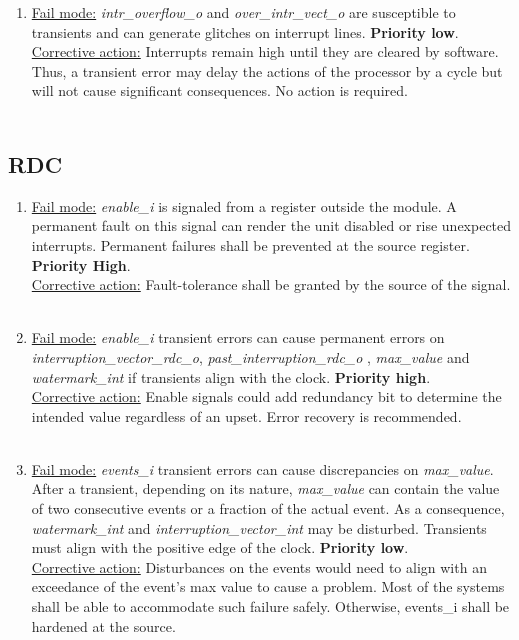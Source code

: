 \begin{enumerate}
\\
\item \underline{Fail mode:} \textit{intr\_overflow\_o} and \textit{over\_intr\_vect\_o} are susceptible to transients and can generate glitches on interrupt lines. \textbf{Priority low}.\\
\underline{Corrective action:}  Interrupts remain high until they are cleared by software. Thus, a transient error may delay the actions of the processor by a cycle but will not cause significant consequences. No action is required.\\
\\
\end{enumerate}
\subsection{RDC}
\begin{enumerate}
\item \underline{Fail mode:} \textit{enable\_i}  is signaled from a register outside the module. A permanent fault on this signal can render the unit disabled or rise unexpected interrupts. Permanent failures shall be prevented at the source register. \textbf{Priority High}.\\
\underline{Corrective action:} Fault-tolerance shall be granted by the source of the signal.\\
\\
\item \underline{Fail mode:} \textit{enable\_i} transient errors can cause permanent errors on \textit{interruption\_vector\_rdc\_o}, \textit{past\_interruption\_rdc\_o} ,\textit{ max\_value} and \textit{watermark\_int} if transients align with the clock. \textbf{Priority high}.\\
\underline{Corrective action:} Enable signals could add redundancy bit to determine the intended value regardless of an upset. Error recovery is recommended.\\
\\
\item \underline{Fail mode:} \textit{events\_i} transient errors can cause discrepancies on \textit{max\_value}.  After a transient, depending on its nature,  \textit{max\_value} can contain the value of two consecutive events or a fraction of the actual event. As a consequence, \textit{watermark\_int} and \textit{interruption\_vector\_int} may be disturbed. Transients must align with the positive edge of the clock. \textbf{Priority low}.\\
\underline{Corrective action:} Disturbances on the events would need to align with an exceedance of the event's max value to cause a problem. Most of the systems shall be able to accommodate such failure safely. Otherwise, events\_i shall be hardened at the source.\\

\end{enumerate}
